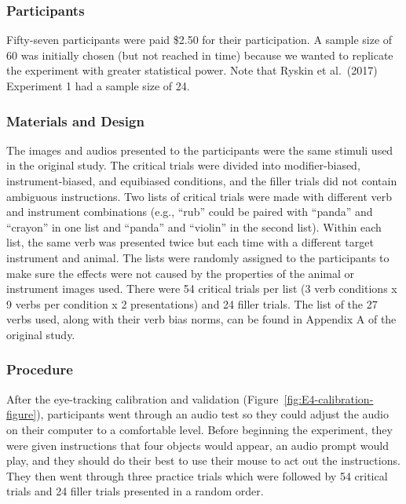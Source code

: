 \documentclass[
  man,floatsintext]{apa6}
\begin{document}
\subsubsection{Participants}\label{participants-5}

Fifty-seven participants were paid \$2.50 for their participation. A sample size of 60 was initially chosen (but not reached in time) because we wanted to replicate the experiment with greater statistical power. Note that Ryskin et al.~(2017) Experiment 1 had a sample size of 24.

\subsubsection{Materials and Design}\label{materials-and-design-4}

The images and audios presented to the participants were the same
stimuli used in the original study. The critical
trials were divided into modifier-biased, instrument-biased, and
equibiased conditions, and the filler trials did not contain ambiguous
instructions. Two lists of critical trials were made with different verb
and instrument combinations (e.g., ``rub'' could be paired with ``panda''
and ``crayon'' in one list and ``panda'' and ``violin'' in the second list).
Within each list, the same verb was presented twice but each time with a
different target instrument and animal. The lists were randomly assigned
to the participants to make sure the effects were not caused by the
properties of the animal or instrument images used. There were 54 critical trials per list (3 verb conditions x 9 verbs per condition x 2 presentations) and 24 filler trials. The list of the 27 verbs used, along with their verb bias norms, can be found in Appendix A of the original study.

\subsubsection{Procedure}\label{procedure-4}

After the eye-tracking calibration and validation (Figure~\ref{fig:E4-calibration-figure}), participants went through an audio
test so they could adjust the audio on their computer to a comfortable
level. Before beginning the experiment, they were given instructions
that four objects would appear, an audio prompt would play, and they
should do their best to use their mouse to act out the instructions.
They then went through three practice trials which were followed by 54
critical trials and 24 filler trials presented in a random order.
\end{document}
